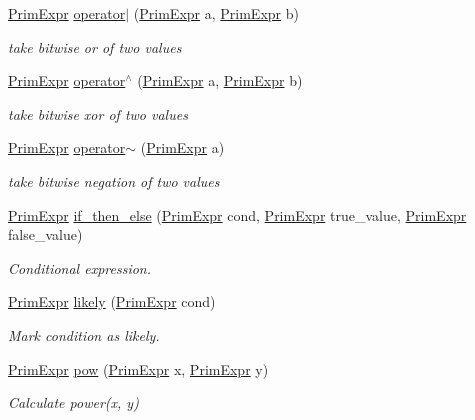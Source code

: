\begin{DoxyCompactItemize}
\hyperlink{classtvm_1_1PrimExpr}{Prim\+Expr} \hyperlink{namespacetvm_a236d9aae385e6697874f75e4c8a69f8d}{operator$\vert$} (\hyperlink{classtvm_1_1PrimExpr}{Prim\+Expr} a, \hyperlink{classtvm_1_1PrimExpr}{Prim\+Expr} b)
\begin{DoxyCompactList}\small\item\em take bitwise or of two values \end{DoxyCompactList}\item 
\hyperlink{classtvm_1_1PrimExpr}{Prim\+Expr} \hyperlink{namespacetvm_abd7d1b3232218b25e2e0cf6ef699a65f}{operator$^\wedge$} (\hyperlink{classtvm_1_1PrimExpr}{Prim\+Expr} a, \hyperlink{classtvm_1_1PrimExpr}{Prim\+Expr} b)
\begin{DoxyCompactList}\small\item\em take bitwise xor of two values \end{DoxyCompactList}\item 
\hyperlink{classtvm_1_1PrimExpr}{Prim\+Expr} \hyperlink{namespacetvm_a354b9954ff25dd819a51d856fdd38827}{operator$\sim$} (\hyperlink{classtvm_1_1PrimExpr}{Prim\+Expr} a)
\begin{DoxyCompactList}\small\item\em take bitwise negation of two values \end{DoxyCompactList}\item 
\hyperlink{classtvm_1_1PrimExpr}{Prim\+Expr} \hyperlink{namespacetvm_ad400409d87dc337f8b5fe13e18d363f9}{if\+\_\+then\+\_\+else} (\hyperlink{classtvm_1_1PrimExpr}{Prim\+Expr} cond, \hyperlink{classtvm_1_1PrimExpr}{Prim\+Expr} true\+\_\+value, \hyperlink{classtvm_1_1PrimExpr}{Prim\+Expr} false\+\_\+value)
\begin{DoxyCompactList}\small\item\em Conditional expression. \end{DoxyCompactList}\item 
\hyperlink{classtvm_1_1PrimExpr}{Prim\+Expr} \hyperlink{namespacetvm_ad6ee4c2d41e7e226d1995112cd12e3f1}{likely} (\hyperlink{classtvm_1_1PrimExpr}{Prim\+Expr} cond)
\begin{DoxyCompactList}\small\item\em Mark condition as likely. \end{DoxyCompactList}\item 
\hyperlink{classtvm_1_1PrimExpr}{Prim\+Expr} \hyperlink{namespacetvm_a880f0cd15891153430b669f0b4eca2fe}{pow} (\hyperlink{classtvm_1_1PrimExpr}{Prim\+Expr} x, \hyperlink{classtvm_1_1PrimExpr}{Prim\+Expr} y)
\begin{DoxyCompactList}\small\item\em Calculate power(x, y) \end{DoxyCompactList}\item 

\end{DoxyCompactItemize}

